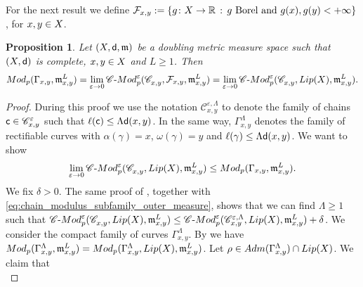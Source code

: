 \documentclass[12pt]{amsart}
\newcommand{\R}{\mathbb{R}}
\newcommand{\sfd}{{\sf d}}
\newcommand{\X}{{\rm X}}
\newcommand{\Lip}{{\rm Lip}}
\newcommand{\mm}{\mathfrak m}
\newtheorem{proposition}[theorem]{Proposition}
\theoremstyle{definition}
\newcommand{\Mod}{\textup{Mod}}
\newcommand{\cModepsilon}[2]{{\mathscr C}\text{-}{\rm Mod}_{#2}^{#1}}
\newcommand{\sfc}{{\sf c}}
\newcommand{\Chain}[1]{\mathscr{C}^{#1}}
\begin{document}
For the next result we define $\mathcal{F}_{x,y} := \{g \colon \X \to \R \,:\, g \text{ Borel and } g(x),g(y) < +\infty\}$, for $x,y\in \X$. 
%
\begin{proposition}
\label{prop:modulus_chain_modulus_limit}
    Let $(\X,\sfd,\mm)$ be a doubling metric measure space such that $(\X,\sfd)$ is complete, $x,y\in \X$ and $L\ge 1$. Then
    $$\Mod_p(\Gamma_{x,y}, \mm_{x,y}^L) = \lim_{\varepsilon \to 0} \cModepsilon{\varepsilon}{p}(\Chain{}_{x,y}, \mathcal{F}_{x,y} ,\mm_{x,y}^L) = \lim_{\varepsilon \to 0} \cModepsilon{\varepsilon}{p}(\Chain{}_{x,y}, \Lip(\X), \mm_{x,y}^L).$$
\end{proposition}
%
\begin{proof}
    During this proof we use the notation $\Chain{\varepsilon,\Lambda}_{x,y}$ to denote the family of chains $\sfc \in \Chain{\varepsilon}_{x,y}$ such that $\ell(\sfc) \le \Lambda\sfd(x,y)$. 
    In the same way, $\Gamma_{x,y}^\Lambda$ denotes the family of rectifiable curves with $\alpha(\gamma) = x$, $\omega(\gamma) = y$ and $\ell(\gamma) \le \Lambda \sfd(x,y)$. 
    We want to show
    \begin{equation}
        \label{eq:modulus_comparison_1}
        \lim_{\varepsilon \to 0} \cModepsilon{\varepsilon}{p}(\Chain{}_{x,y}, \Lip(\X),\mm_{x,y}^L) \le \Mod_p(\Gamma_{x,y}, \mm_{x,y}^L).
    \end{equation}
    We fix $\delta > 0$. The same proof of \cite[Lemma A.2]{CaputoCavallucci2024}, together with \eqref{eq:chain_modulus_subfamily_outer_measure}, shows that we can find $\Lambda \ge 1$ such that $\cModepsilon{\varepsilon}{p}(\Chain{}_{x,y}, \Lip(\X) ,\mm_{x,y}^L) \le \cModepsilon{\varepsilon}{p}(\Chain{\varepsilon, \Lambda}_{x,y}, \Lip(\X) ,\mm_{x,y}^L) + \delta$. 
    We consider the compact family of curves $\Gamma_{x,y}^\Lambda$.
    By \cite[Proposition 6]{Kei03} we have $\Mod_p(\Gamma_{x,y}^\Lambda, \mm_{x,y}^L) = \Mod_p(\Gamma_{x,y}^\Lambda, \Lip(\X), \mm_{x,y}^L)$. 
    Let $\rho \in {\rm Adm}(\Gamma_{x,y}^\Lambda) \cap \Lip(\X)$.  
    We claim that 
    \begin{equation}

\end{equation}
\end{proof}
\end{document}
